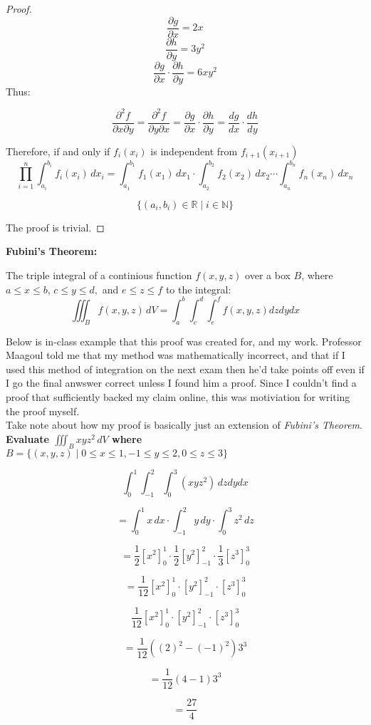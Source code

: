 \documentclass{article}
\begin{document}
\begin{proof}
\[\frac{\partial g}{\partial x} = 2x\]
\[\frac{\partial h}{\partial y} = 3y^{2}\]
\[\frac{\partial g}{\partial x} \cdot \frac{\partial h}{\partial y} = 6xy^{2}\]
Thus:

\[
    \frac{\partial^2 f}{\partial x \partial y} = \frac{\partial^2 f}{\partial y \partial x} = \frac{\partial g}{\partial x} \cdot \frac{\partial h}{\partial y} = \frac{dg}{dx} \cdot \frac{dh}{dy}
\]

Therefore, if and only if $f_i(x_i)$ is independent from $f_{i+1}(x_{i+1})$
\[
\prod_{i=1}^n \int_{a_i}^{b_i} f_i(x_i) \, dx_i = \int_{a_1}^{b_1} f_1(x_1) \, dx_1 \cdot \int_{a_2}^{b_2} f_2(x_2) \, dx_2 \cdots \int_{a_n}^{b_n} f_n(x_n) \, dx_n
\]

\[
    \{(a_i, b_i) \in \mathbb{R}\mid i \in \mathbb{N} \}
\]

The proof is trivial.

\end{proof}

\newpage

\textbf{Fubini's Theorem:}

The triple integral of a continious function \( f(x, y, z) \) over a box \( B \), where $a \leq x \leq b$, $c \leq y \leq d,$ and $e \leq z \leq f$ to the integral:
\[
    \iiint_B f(x, y, z) \, dV = \int_{a}^{b} \int_{c}^{d} \int_{e}^{f}f(x,y,z)dzdydx
\]

Below is in-class example that this proof was created for, and my work. Professor Maagoul told me that my method was mathematically incorrect, and that if I used this method of integration on the next exam then he'd take points off even if I go the final anwswer correct unless I found him a proof. Since I couldn't find a proof that sufficiently backed my claim online, this was motiviation for writing the proof myself. \\
Take note about how my proof is basically just an extension of \textit{Fubini's Theorem}.\\

\textbf{Evaluate $\iiint_B xyz^{2} \, dV$ where $ B = \{(x,y,z) \mid  0 \leq x \leq 1, -1 \leq y \leq 2, 0 \leq z \leq 3\}$}

\[
    \int_{0}^{1} \int_{-1}^{2} \int_{0}^{3}(xyz^{2}) \, dzdydx
\]

\[
    = \int_{0}^{1}x \, dx \cdot \int_{-1}^{2}y \, dy \cdot \int_{0}^{3}z^{2} \, dz
\]

\[
    = \frac{1}{2}[x^{2}]_{0}^{1} \cdot \frac{1}{2}[y^{2}]_{-1}^{2} \cdot \frac{1}{3}[z^{3}]_{0}^{3}
\]

\[
    = \frac{1}{12}[x^{2}]_{0}^{1} \cdot [y^{2}]_{-1}^{2} \cdot [z^{3}]_{0}^{3}
\]

\[
    \frac{1}{12}[x^{2}]_{0}^{1} \cdot [y^{2}]_{-1}^{2} \cdot [z^{3}]_{0}^{3}
\]

\[
    = \frac{1}{12}((2)^{2}-(-1)^{2})3^{3}
\]

\[
    = \frac{1}{12}(4-1)3^{3}
\]


\[
    = \frac{27}{4}
\] 
\end{document}

